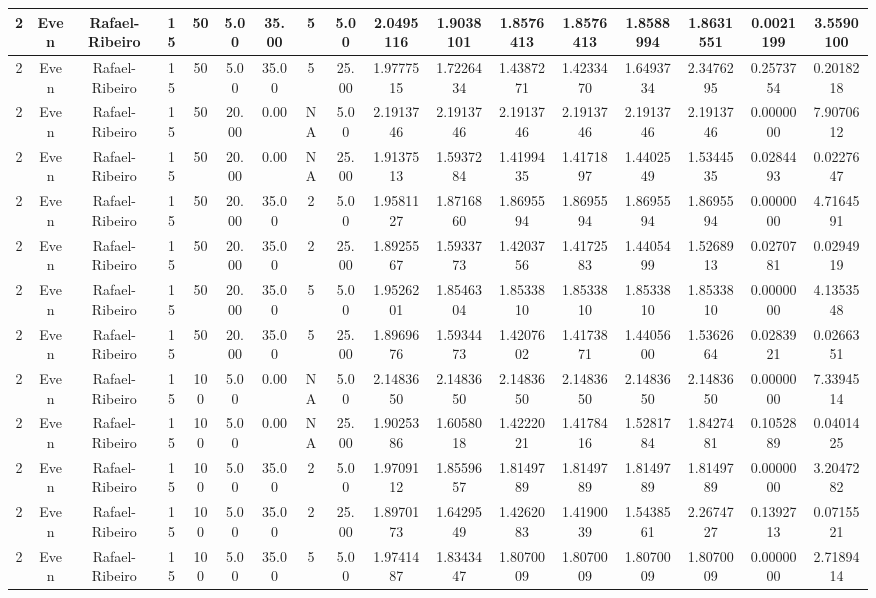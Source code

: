 \documentclass[a4paper]{article}
\begin{document}
\begin{center}
\begin{tabular}{ | c | c | c | c | c | c | c | c | c | c | c | c | c | c | c | c | c | }
		\hline
		2	&	Even	&	Rafael-Ribeiro	&	15	&	50	&	5.00	&	35.00	&	5	&	5.00	&	2.0495116	&	1.9038101	&	1.8576413	&	1.8576413	&	1.8588994	&	1.8631551	&	0.0021199	&	3.5590100 \\
		\hline
		2	&	Even	&	Rafael-Ribeiro	&	15	&	50	&	5.00	&	35.00	&	5	&	25.00	&	1.9777515	&	1.7226434	&	1.4387271	&	1.4233470	&	1.6493734	&	2.3476295	&	0.2573754	&	0.2018218 \\
		\hline
		2	&	Even	&	Rafael-Ribeiro	&	15	&	50	&	20.00	&	0.00	&	NA	&	5.00	&	2.1913746	&	2.1913746	&	2.1913746	&	2.1913746	&	2.1913746	&	2.1913746	&	0.0000000	&	7.9070612 \\
		\hline
		2	&	Even	&	Rafael-Ribeiro	&	15	&	50	&	20.00	&	0.00	&	NA	&	25.00	&	1.9137513	&	1.5937284	&	1.4199435	&	1.4171897	&	1.4402549	&	1.5344535	&	0.0284493	&	0.0227647 \\
		\hline
		2	&	Even	&	Rafael-Ribeiro	&	15	&	50	&	20.00	&	35.00	&	2	&	5.00	&	1.9581127	&	1.8716860	&	1.8695594	&	1.8695594	&	1.8695594	&	1.8695594	&	0.0000000	&	4.7164591 \\
		\hline
		2	&	Even	&	Rafael-Ribeiro	&	15	&	50	&	20.00	&	35.00	&	2	&	25.00	&	1.8925567	&	1.5933773	&	1.4203756	&	1.4172583	&	1.4405499	&	1.5268913	&	0.0270781	&	0.0294919 \\
		\hline
		2	&	Even	&	Rafael-Ribeiro	&	15	&	50	&	20.00	&	35.00	&	5	&	5.00	&	1.9526201	&	1.8546304	&	1.8533810	&	1.8533810	&	1.8533810	&	1.8533810	&	0.0000000	&	4.1353548 \\
		\hline
		2	&	Even	&	Rafael-Ribeiro	&	15	&	50	&	20.00	&	35.00	&	5	&	25.00	&	1.8969676	&	1.5934473	&	1.4207602	&	1.4173871	&	1.4405600	&	1.5362664	&	0.0283921	&	0.0266351 \\
		\hline
		2	&	Even	&	Rafael-Ribeiro	&	15	&	100	&	5.00	&	0.00	&	NA	&	5.00	&	2.1483650	&	2.1483650	&	2.1483650	&	2.1483650	&	2.1483650	&	2.1483650	&	0.0000000	&	7.3394514 \\
		\hline
		2	&	Even	&	Rafael-Ribeiro	&	15	&	100	&	5.00	&	0.00	&	NA	&	25.00	&	1.9025386	&	1.6058018	&	1.4222021	&	1.4178416	&	1.5281784	&	1.8427481	&	0.1052889	&	0.0401425 \\
		\hline
		2	&	Even	&	Rafael-Ribeiro	&	15	&	100	&	5.00	&	35.00	&	2	&	5.00	&	1.9709112	&	1.8559657	&	1.8149789	&	1.8149789	&	1.8149789	&	1.8149789	&	0.0000000	&	3.2047282 \\
		\hline
		2	&	Even	&	Rafael-Ribeiro	&	15	&	100	&	5.00	&	35.00	&	2	&	25.00	&	1.8970173	&	1.6429549	&	1.4262083	&	1.4190039	&	1.5438561	&	2.2674727	&	0.1392713	&	0.0715521 \\
		\hline
		2	&	Even	&	Rafael-Ribeiro	&	15	&	100	&	5.00	&	35.00	&	5	&	5.00	&	1.9741487	&	1.8343447	&	1.8070009	&	1.8070009	&	1.8070009	&	1.8070009	&	0.0000000	&	2.7189414 \\

\end{tabular}
\end{center}
\end{document}
